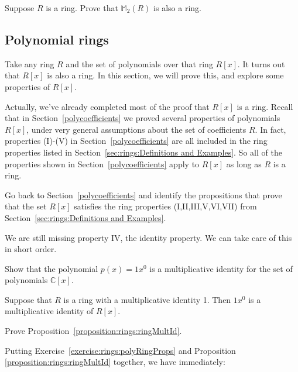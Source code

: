 \begin{exercise}
Suppose $R$ is a ring. Prove that  ${\mathbb M}_2(R)$ is also a ring.
\end{exercise}


\subsection{Polynomial  rings}\label{sec:polynomialRings}

Take any ring $R$ and the set of polynomials over that ring $R[x]$.  It turns out that $R[x]$ is also a ring.  In this section, we will prove this, and explore some properties of $R[x]$. 

Actually, we've already completed most of the proof that $R[x]$ is a ring. Recall that in Section~\ref{polycoefficients} we proved several properties of polynomials $R[x]$, under very general assumptions about the set of coefficients $R$.  In fact, properties (I)-(V) in Section~\ref{polycoefficients} are all included in the ring properties listed in Section~\ref{sec:rings:Definitions and Examples}. So all of the properties shown in Section~\ref{polycoefficients} apply to $R[x]$ as long as $R$ is a ring.

\begin{exercise}\label{exercise:rings:polyRingProps}
Go back to Section~\ref{polycoefficients} and identify the propositions that prove that the set $R[x]$ satisfies the ring properties (I,II,III,V,VI,VII) from Section~\ref{sec:rings:Definitions and Examples}.
\end{exercise}

We are still missing property IV, the identity property. We can take care of this in short order.

\begin{exercise}
Show that the polynomial $p(x) = 1x^0$ is a multiplicative identity for the set of polynomials $\mathbb{C}[x]$.
\end{exercise}

\begin{prop}\label{proposition:rings:ringMultId}
Suppose that $R$ is a ring with a multiplicative identity 1. Then $1x^0$ is a multiplicative identity of $R[x]$.
\end{prop}

\begin{exercise}
Prove Proposition~\ref{proposition:rings:ringMultId}.
\end{exercise}

Putting Exercise~\ref{exercise:rings:polyRingProps} and Proposition \ref{proposition:rings:ringMultId} together, we have immediately:

